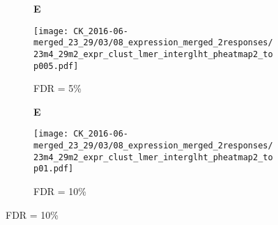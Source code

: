 \documentclass[a4paper, 12pt]{article}
\begin{document}
\begin{figure}[!thb]
\centering

    \caption{Per cluster marker expression}
    \begin{subfigure}[t]{0.02\textwidth}
    \vskip 0pt
        \textbf{\textsf{\normalsize E}}
    \end{subfigure}
    \begin{subfigure}[t]{0.9\textwidth}
    \vskip 0pt
    \caption{FDR = 5\%}
        \texttt{[image: CK\_2016-06-merged\_23\_29/03/08\_expression\_merged\_2responses/23m4\_29m2\_expr\_clust\_lmer\_interglht\_pheatmap2\_top005.pdf]}
    \end{subfigure}

    \begin{subfigure}[t]{0.02\textwidth}
    \vskip 0pt
        \textbf{\textsf{\normalsize E}}
    \end{subfigure}
    \begin{subfigure}[t]{0.9\textwidth}
    \vskip 0pt
    \caption{FDR = 10\%}
        \texttt{[image: CK\_2016-06-merged\_23\_29/03/08\_expression\_merged\_2responses/23m4\_29m2\_expr\_clust\_lmer\_interglht\_pheatmap2\_top01.pdf]}
    \end{subfigure}
    
\end{figure}
\end{document}
